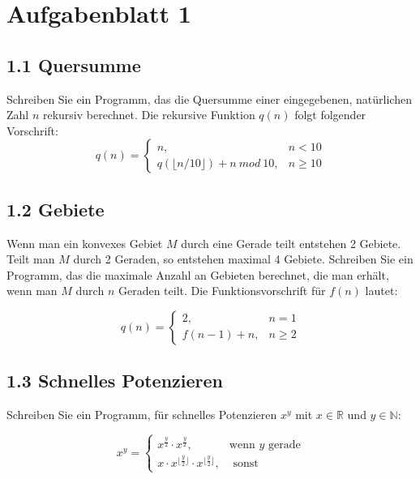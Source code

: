 \documentclass[pdflatex,a4paper,11pt]{scrartcl}
\author{J. Schönbohm}
\date{\today}
\begin{document}
\section*{Aufgabenblatt 1}
\subsection*{1.1 Quersumme} 
Schreiben Sie ein Programm, das 
die Quersumme einer eingegebenen, nat\"urlichen Zahl $n$ rekursiv berechnet. Die rekursive Funktion $q(n)$ folgt folgender Vorschrift:
$$q(n)=\left\{ 
\begin{array}{cl}
n,&n<10\\
q(\lfloor n/10\rfloor ) + n\ mod\ 10, &n\ge 10
\end{array}
\right.$$
\subsection*{1.2 Gebiete} 
Wenn man ein konvexes Gebiet $M$ durch eine Gerade teilt entstehen 2 Gebiete. Teilt man $M$ durch 2 Geraden, so entstehen maximal 4 Gebiete. \newline
Schreiben Sie ein Programm, das 
die maximale Anzahl an Gebieten berechnet, die man erh\"alt, wenn man $M$ durch $n$ Geraden teilt. Die Funktionsvorschrift f\"ur $f(n)$ lautet:

$$q(n)=\left\{ 
\begin{array}{cl}
2,&n=1\\
f(n-1) + n, &n\ge 2
\end{array}
\right.$$
\subsection*{1.3 Schnelles Potenzieren} 
Schreiben Sie ein Programm, f\"ur schnelles Potenzieren $x^y$ mit $x\in\mathbb{R}$ und $y\in\mathbb{N}$:

$$x^y=\left\{ 
\begin{array}{cl}
x^\frac{y}{2}\cdot x^\frac{y}{2},&\mbox{wenn }y\mbox{ gerade}\\
x\cdot x^{\lfloor\frac{y}{2}\rfloor}\cdot x^{\lfloor\frac{y}{2}\rfloor} , &\mbox{ sonst}
\end{array}
\right.$$
\end{document}
